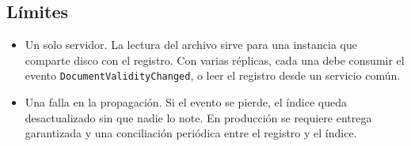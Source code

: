 \subsection{Límites}

\begin{itemize}
  \item Un solo servidor. La lectura del archivo sirve para una instancia que comparte disco con el registro. Con varias réplicas, cada una debe consumir el evento \texttt{DocumentValidityChanged}, o leer el registro desde un servicio común.
  \item Una falla en la propagación. Si el evento se pierde, el índice queda desactualizado sin que nadie lo note. En producción se requiere entrega garantizada y una conciliación periódica entre el registro y el índice.
\end{itemize}

